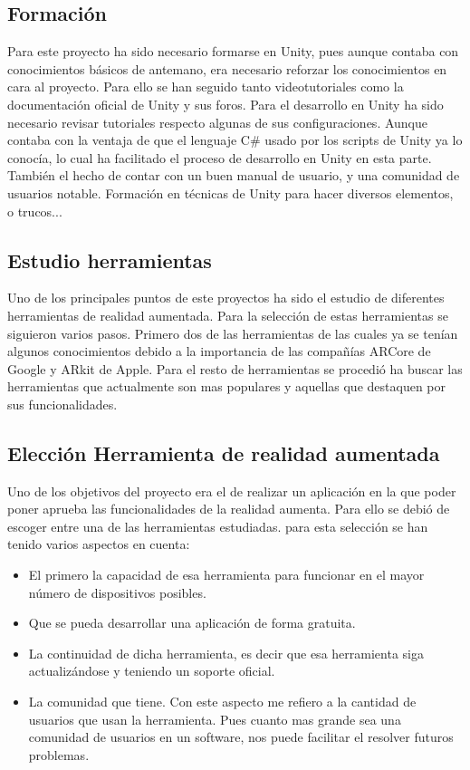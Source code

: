 
\subsection{Formación}
Para este proyecto ha sido necesario formarse en Unity, pues aunque contaba con conocimientos básicos de antemano, era necesario reforzar los conocimientos en cara al proyecto. Para ello se han seguido tanto videotutoriales como la documentación oficial de Unity y sus foros.
Para el desarrollo en Unity ha sido necesario revisar tutoriales respecto algunas de sus configuraciones.
Aunque contaba con la ventaja de que el lenguaje C\# usado por los scripts de Unity ya lo conocía, lo cual ha facilitado el proceso de desarrollo en Unity en esta parte. También el hecho de contar con un buen manual de usuario, y una comunidad de usuarios notable.
Formación en técnicas de Unity para hacer diversos elementos, o trucos...

\subsection{Estudio herramientas}
Uno de los principales puntos de este proyectos ha sido el estudio de diferentes herramientas de realidad aumentada. Para la selección de estas herramientas se siguieron varios pasos. Primero dos de las herramientas de las cuales ya se tenían algunos conocimientos debido a la importancia de las compañías ARCore de Google y ARkit de Apple. Para el resto de herramientas se procedió ha buscar las herramientas que actualmente son mas populares y aquellas que destaquen por sus funcionalidades.

\subsection{Elección Herramienta de realidad aumentada}

Uno de los objetivos del proyecto era el de realizar un aplicación en la que poder poner aprueba las funcionalidades de la realidad aumenta. Para ello se debió de escoger entre una de las herramientas estudiadas. para esta selección se han tenido varios aspectos en cuenta: 
\begin{itemize}
	\item El primero la capacidad de esa herramienta para funcionar en el mayor número de dispositivos posibles.
	\item Que se pueda desarrollar una aplicación de forma gratuita.
	\item La continuidad de dicha herramienta, es decir que esa herramienta siga actualizándose y teniendo un soporte oficial.
	\item La comunidad que tiene. Con este aspecto me refiero a la cantidad de usuarios que usan la herramienta. Pues cuanto mas grande sea una comunidad de usuarios en un software, nos puede facilitar el resolver futuros problemas.
	
\end{itemize}

